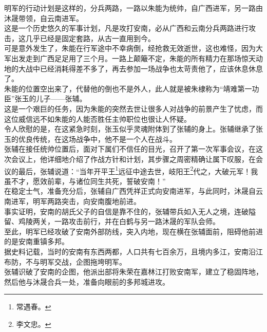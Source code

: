 \begin{multicols}{\theparacolNo}
明军的行动计划是这样的，分兵两路，一路以朱能为统帅，自广西进军，另一路由沐晟带领，自云南进军。\\

这是一个历史悠久的军事计划，凡是攻打安南，必从广西和云南分兵两路进行攻击，这几乎已经是固定套路，从古一直用到今。\\

可是意外发生了，朱能在行军途中不幸病倒，经抢救无效逝世，这也难怪，因为大军出发走到广西足足用了三个月。一路上颠簸不定，朱能的所有精力在那场惊天动地的大战中已经消耗得差不多了，再去参加一场战争也太苛责他了，应该休息休息了。\\

朱能的位置空出来了，代替他的倒也不是外人，此人就是被朱棣称为“靖难第一功臣”张玉的儿子——张辅。\\

这是一个艰巨的任务，因为朱能的突然去世让很多人对战争的前景产生了忧虑，而这位威信远不如朱能的人能否胜任主帅职位也很让人怀疑。\\

令人欣慰的是，在这紧急时刻，张玉似乎灵魂附体到了张辅的身上。张辅继承了张玉的优良传统，在这场战争中，他不是一个人在战斗。\\

张辅在接任统帅位置后，面对下属们不信任的目光，召开了第一次军事会议，在这次会议上，他详细地介绍了作战方针和计划，其步骤之周密精确让属下叹服，在会议的最后，张辅说道：“当年开平王\footnote{常遇春。}远征中途去世，岐阳王\footnote{李文忠。}代之，大破元军！我虽不才，愿效前辈，与诸位同生共死，誓破安南！”\\

在稳定士气，准备充分后，张辅自广西凭祥正式向安南进军，与此同时，沐晟自云南进军，明军两路突击，向安南腹地前进。\\

事实证明，安南的胡氏父子的自信是靠不住的，张辅带兵如入无人之境，连破隘留、鸡陵两关，一路攻击前行，并在白鹤与另一路沐晟的军队会师。\\

至此，明军已经攻破了安南外部防线，突入内地，现在横在张辅面前，阻碍他前进的是安南重镇多邦。\\

据史料记载，当时的安南有东西两都，人口共有七百余万，且境内多江，安南沿江布防，不与明军交战，企图拖垮明军。\\

张辅识破了安南的企图，他派出部将朱荣在嘉林江打败安南军，建立了稳固阵地，然后他与沐晟合兵一处，准备向眼前的多邦城进攻。\\


\end{multicols}
